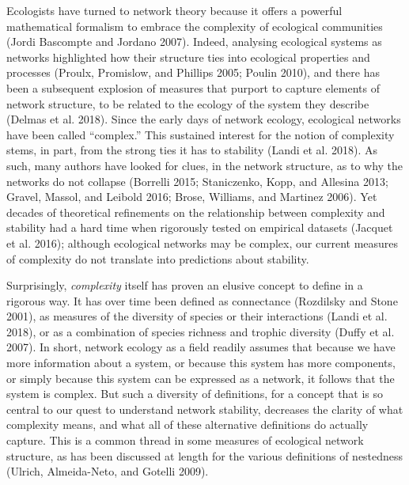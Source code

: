 \documentclass[11pt]{article}
\begin{document}
Ecologists have turned to network theory because it offers a powerful
mathematical formalism to embrace the complexity of ecological
communities (Jordi Bascompte and Jordano 2007). Indeed, analysing
ecological systems as networks highlighted how their structure ties into
ecological properties and processes (Proulx, Promislow, and Phillips
2005; Poulin 2010), and there has been a subsequent explosion of
measures that purport to capture elements of network structure, to be
related to the ecology of the system they describe (Delmas et al. 2018).
Since the early days of network ecology, ecological networks have been
called ``complex.'' This sustained interest for the notion of complexity
stems, in part, from the strong ties it has to stability (Landi et al.
2018). As such, many authors have looked for clues, in the network
structure, as to why the networks do not collapse (Borrelli 2015;
Staniczenko, Kopp, and Allesina 2013; Gravel, Massol, and Leibold 2016;
Brose, Williams, and Martinez 2006). Yet decades of theoretical
refinements on the relationship between complexity and stability had a
hard time when rigorously tested on empirical datasets (Jacquet et al.
2016); although ecological networks may be complex, our current measures
of complexity do not translate into predictions about stability.

Surprisingly, \emph{complexity} itself has proven an elusive concept to
define in a rigorous way. It has over time been defined as connectance
(Rozdilsky and Stone 2001), as measures of the diversity of species or
their interactions (Landi et al. 2018), or as a combination of species
richness and trophic diversity (Duffy et al. 2007). In short, network
ecology as a field readily assumes that because we have more information
about a system, or because this system has more components, or simply
because this system can be expressed as a network, it follows that the
system is complex. But such a diversity of definitions, for a concept
that is so central to our quest to understand network stability,
decreases the clarity of what complexity means, and what all of these
alternative definitions do actually capture. This is a common thread in
some measures of ecological network structure, as has been discussed at
length for the various definitions of nestedness (Ulrich, Almeida-Neto,
and Gotelli 2009).
\end{document}
